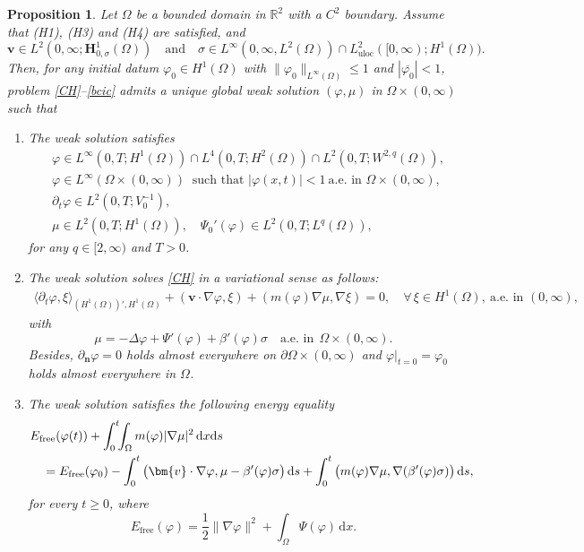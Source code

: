 \documentclass[11pt,reqno]{amsart}
\newtheorem{proposition}{\textbf{Proposition}}[section]
\def\d{{\rm d}}
\def\l{\langle}
\def\r{\rangle}
\def\H{\bm{H}}
\def\n{{\bm{n}}}
\newcommand{\uloc}{\operatorname{uloc}}
\def\vv{\bm{v}}
\begin{document}
\begin{proposition}
\label{well-pos}
Let $\Omega$ be a bounded domain in $\mathbb{R}^2$ with a $C^2$ boundary. Assume that (H1), (H3) and (H4) are satisfied, and
$$
\vv \in  L^2(0,\infty;\H^1_{0,\sigma}(\Omega))\quad \text{and}\quad
\sigma \in L^\infty(0,\infty,L^2(\Omega))\cap L_{\uloc}^2([0,\infty); H^1(\Omega)).
$$
Then, for any initial datum $\varphi_0\in H^1(\Omega)$ with $\| \varphi_0\|_{L^\infty(\Omega)}\leq 1$ and $\left|\overline{\varphi_0}\right|<1$, problem \eqref{CH}--\eqref{bcic} admits a unique global weak solution $(\varphi,\mu)$ in $\Omega\times (0,\infty)$ such that
%
\begin{enumerate}
\item The weak solution satisfies
\begin{align*}
&\varphi \in  L^\infty(0,T ; H^1(\Omega))\cap L^4(0,T;H^2(\Omega))\cap L^2(0,T;W^{2,q}(\Omega)),\\
&\varphi \in L^{\infty}(\Omega\times (0,\infty))\ \text{ such that }  |\varphi(x,t)|<1  \ \text{a.e. in }\Omega\times (0,\infty),\\
&\partial_t \varphi \in L^2(0,T; V_0^{-1}),\\
& \mu \in L^2(0,T;H^1(\Omega)),
\quad\Psi_0'(\varphi)\in L^2(0,T;L^q(\Omega)),
\end{align*}
 for any $q\in [2,\infty)$ and $T>0$.
 \smallskip
%
\item The weak solution solves \eqref{CH} in a variational sense as follows:
\begin{align}
\label{e2}
\l \partial_t \varphi,\xi\r_{(H^1(\Omega))',H^1(\Omega)}
+ ( \vv\cdot \nabla \varphi,\xi)
+ (m(\varphi)\nabla \mu, \nabla \xi) =0,
\quad \forall \, \xi \in H^1(\Omega), \ \text{a.e. in } (0,\infty),
\end{align}
with
$$\mu=-\Delta \varphi + \Psi'(\varphi) + \beta'(\varphi) \sigma\quad \text{a.e. in}\ \ \Omega\times (0,\infty).
$$
Besides, $\partial_\n \varphi=0$ holds almost everywhere on $\partial\Omega\times(0,\infty)$ and
$\varphi|_{t=0}=\varphi_0$ holds almost everywhere in $\Omega$.
\smallskip
%
\item The weak solution satisfies the following energy equality
\begin{align}
& E_{\mathrm{free}}(\varphi(t))
+ \int_0^t\!\!\int_\Omega
m(\varphi)| \nabla \mu|^2 \,\d x \d s
\notag \\
&\quad =  E_{\mathrm{free}}(\varphi_0) - \int_{0}^t \big(\vv \cdot \nabla \varphi, \mu-\beta'(\varphi) \sigma\big) \, \d s
+  \int_{0}^t \big(m(\varphi)\nabla \mu, \nabla (\beta'(\varphi)\sigma)\big) \, \d s,
\label{EI}
\end{align}
for every $t\geq 0$, where
$$
E_{\mathrm{free}}(\varphi)=\frac12\|\nabla \varphi\|^2+\int_\Omega \Psi(\varphi)\,\mathrm{d}x.
$$
\end{enumerate}
\end{proposition}
\end{document}
